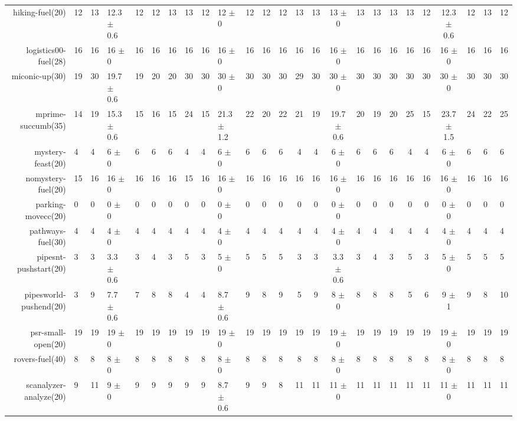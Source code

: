 \begin{center}
\begin{tabular}{|rHHHHHHHHHHHHcccHHH|cccHHH|}
hiking-fuel(20) & 12 & 13 & 12.3 \(\pm\) 0.6 & 12 & 12 & 13 & 13 & 12 & 12 \(\pm\) 0 & 12 & 12 & 12 & 13 & 13 & 13 \(\pm\) 0 & 13 & 13 & 13 & 13 & 12 & 12.3 \(\pm\) 0.6 & 12 & 13 & 12\\
logistics00-fuel(28) & 16 & 16 & 16 \(\pm\) 0 & 16 & 16 & 16 & 16 & 16 & 16 \(\pm\) 0 & 16 & 16 & 16 & 16 & 16 & 16 \(\pm\) 0 & 16 & 16 & 16 & 16 & 16 & 16 \(\pm\) 0 & 16 & 16 & 16\\
miconic-up(30) & 19 & 30 & 19.7 \(\pm\) 0.6 & 19 & 20 & 20 & 30 & 30 & 30 \(\pm\) 0 & 30 & 30 & 30 & 29 & 30 & 30 \(\pm\) 0 & 30 & 30 & 30 & 30 & 30 & 30 \(\pm\) 0 & 30 & 30 & 30\\
mprime-succumb(35) & 14 & 19 & 15.3 \(\pm\) 0.6 & 15 & 16 & 15 & 24 & 15 & 21.3 \(\pm\) 1.2 & 22 & 20 & 22 & 21 & 19 & 19.7 \(\pm\) 0.6 & 20 & 19 & 20 & 25 & 15 & 23.7 \(\pm\) 1.5 & 24 & 22 & 25\\
mystery-feast(20) & 4 & 4 & 6 \(\pm\) 0 & 6 & 6 & 6 & 4 & 4 & 6 \(\pm\) 0 & 6 & 6 & 6 & 4 & 4 & 6 \(\pm\) 0 & 6 & 6 & 6 & 4 & 4 & 6 \(\pm\) 0 & 6 & 6 & 6\\
nomystery-fuel(20) & 15 & 16 & 16 \(\pm\) 0 & 16 & 16 & 16 & 15 & 16 & 16 \(\pm\) 0 & 16 & 16 & 16 & 16 & 16 & 16 \(\pm\) 0 & 16 & 16 & 16 & 16 & 16 & 16 \(\pm\) 0 & 16 & 16 & 16\\
parking-movecc(20) & 0 & 0 & 0 \(\pm\) 0 & 0 & 0 & 0 & 0 & 0 & 0 \(\pm\) 0 & 0 & 0 & 0 & 0 & 0 & 0 \(\pm\) 0 & 0 & 0 & 0 & 0 & 0 & 0 \(\pm\) 0 & 0 & 0 & 0\\
pathways-fuel(30) & 4 & 4 & 4 \(\pm\) 0 & 4 & 4 & 4 & 4 & 4 & 4 \(\pm\) 0 & 4 & 4 & 4 & 4 & 4 & 4 \(\pm\) 0 & 4 & 4 & 4 & 4 & 4 & 4 \(\pm\) 0 & 4 & 4 & 4\\
pipesnt-pushstart(20) & 3 & 3 & 3.3 \(\pm\) 0.6 & 3 & 4 & 3 & 5 & 3 & 5 \(\pm\) 0 & 5 & 5 & 5 & 3 & 3 & 3.3 \(\pm\) 0.6 & 3 & 4 & 3 & 5 & 3 & 5 \(\pm\) 0 & 5 & 5 & 5\\
pipesworld-pushend(20) & 3 & 9 & 7.7 \(\pm\) 0.6 & 7 & 8 & 8 & 4 & 4 & 8.7 \(\pm\) 0.6 & 9 & 8 & 9 & 5 & 9 & 8 \(\pm\) 0 & 8 & 8 & 8 & 5 & 6 & 9 \(\pm\) 1 & 9 & 8 & 10\\
psr-small-open(20) & 19 & 19 & 19 \(\pm\) 0 & 19 & 19 & 19 & 19 & 19 & 19 \(\pm\) 0 & 19 & 19 & 19 & 19 & 19 & 19 \(\pm\) 0 & 19 & 19 & 19 & 19 & 19 & 19 \(\pm\) 0 & 19 & 19 & 19\\
rovers-fuel(40) & 8 & 8 & 8 \(\pm\) 0 & 8 & 8 & 8 & 8 & 8 & 8 \(\pm\) 0 & 8 & 8 & 8 & 8 & 8 & 8 \(\pm\) 0 & 8 & 8 & 8 & 8 & 8 & 8 \(\pm\) 0 & 8 & 8 & 8\\
scanalyzer-analyze(20) & 9 & 11 & 9 \(\pm\) 0 & 9 & 9 & 9 & 9 & 9 & 8.7 \(\pm\) 0.6 & 9 & 9 & 8 & 11 & 11 & 11 \(\pm\) 0 & 11 & 11 & 11 & 11 & 11 & 11 \(\pm\) 0 & 11 & 11 & 11\\

\end{tabular}
\end{center}

